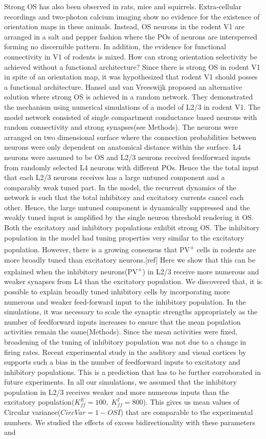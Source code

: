 Strong OS has also been observed in rats, mice and squirrels. Extra-cellular recordings and two-photon calcium imaging show no evidence for the existence of orientation maps in these animals. Instead, OS neurons in the rodent V1 are arranged in a salt and pepper fashion where the POs of neurons are interspersed forming no discernible pattern. In addition, the evidence for functional connectivity in V1 of rodents is mixed. How can strong orientation selectivity be achieved without a functional architecture? Since there is strong OS in rodent V1 in spite of an orientation map, it was hypothesized that rodent V1 should posses a functional architecture. Hansel and van Vreeswijk \cite{Hansel2012} proposed an alternative solution where strong OS is achieved in a random network. They demonstrated the mechanism using numerical simulations of a model of L2/3 in rodent V1. The model network consisted of single compartment conductance based neurons with random connectivity and strong synapses(see Methods). The neurons were arranged on two dimensional surface where the connection probabilities between neurons were only dependent on anatomical distance within the surface. L4 neurons were assumed to be OS and L2/3 neurons received feedforward inputs from randomly selected L4 neurons with different POs. Hence the the total input that each L2/3 neurons receives has a large untuned component and a comparably weak tuned part. In the model, the recurrent dynamics of the network is such that the total inhibitory and excitatory currents cancel each other. Hence, the large untuned component is dynamically suppressed and the weakly tuned input is amplified by the single neuron threshold rendering it OS. Both the excitatory and inhibitory populations exhibit strong OS. The inhibitory population in the model had tuning properties very similar to the excitatory population. However, there is a growing consensus that PV\textsuperscript{+} cells in rodents are more broadly tuned than excitatory neurons.[ref] Here we show that this can be explained when the inhibitory neurons(PV\textsuperscript{+}) in L2/3 receive more numerous and weaker synapses from L4 than the excitatory population.  We discovered that, it is possible to explain broadly tuned inhibitory cells by incorporating more numerous and weaker feed-forward input to the inhibitory population. In the simulations, it was necessary to scale the synaptic strengths appropriately as the number of feedforward inputs increases to ensure that the mean population activities remain the same(Methods). Since the mean activities were fixed, broadening of the tuning of inhibitory population was not due to a change in firing rates. Recent experimental study in the auditory and visual cortices by \cite{Ji2015} supports such a bias in the number of feedforward inputs to excitatory and inhibitory populations. This is a prediction that has to be further corroborated in future experiments. In all our simulations, we assumed that the inhibitory population in L2/3 receives weaker and more numerous inputs than the excitatory population($K_{ff}^{E} = 100, \; K_{ff}^{I} = 800$). This gives us mean values of Circular variance($CircVar = 1 - OSI$) that are comparable to the experimental numbers. We studied the effects of excess bidirectionality with these parameters and 